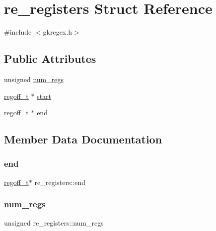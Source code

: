 \hypertarget{structre__registers}{}\section{re\+\_\+registers Struct Reference}
\label{structre__registers}


{\ttfamily \#include $<$gkregex.\+h$>$}

\subsection*{Public Attributes}
\begin{DoxyCompactItemize}
\item 
unsigned \hyperlink{structre__registers_aeae8140aadf339f6fe0c49277d6aa7b5}{num\+\_\+regs}
\item 
\hyperlink{gkregex_8h_a5b34995b47432512ee4ffa32b836e65f}{regoff\+\_\+t} $\ast$ \hyperlink{structre__registers_a6676ddb6ab07e50191e149b04dbcfe03}{start}
\item 
\hyperlink{gkregex_8h_a5b34995b47432512ee4ffa32b836e65f}{regoff\+\_\+t} $\ast$ \hyperlink{structre__registers_a0a9d373f1ab74c9c2063f233476fa5d4}{end}
\end{DoxyCompactItemize}


\subsection{Member Data Documentation}
\mbox{\label{structre__registers_a0a9d373f1ab74c9c2063f233476fa5d4}} 
\subsubsection{\texorpdfstring{end}{end}}
{\footnotesize\ttfamily \hyperlink{gkregex_8h_a5b34995b47432512ee4ffa32b836e65f}{regoff\+\_\+t}$\ast$ re\+\_\+registers\+::end}

\mbox{\label{structre__registers_aeae8140aadf339f6fe0c49277d6aa7b5}} 
\subsubsection{\texorpdfstring{num\+\_\+regs}{num\_regs}}
{\footnotesize\ttfamily unsigned re\+\_\+registers\+::num\+\_\+regs}

